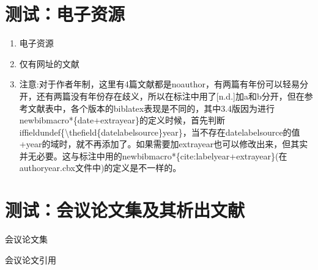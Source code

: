 \documentclass[twoside]{article}
\begin{document}
\section{测试：电子资源}
\begin{refsection}
\begin{enumerate}
  \item 电子资源\cite{Commonwealth--,HOPKINSON--,OMG2003--,OCLC--,李强2012-05-03--,萧钰2001--,Alliance--,Dublin2012-06-14--,JabRef中文手册--,1989--,JabRefManual--}

  \item 仅有网址的文献
\cite{1962-50-50,2009-155-155}
\cite{olnoauthorcn}
\cite{olnoauthoren}
\cite{Allianceurlonly}

\item 注意:对于作者年制，这里有4篇文献都是noauthor，有两篇有年份可以轻易分开，还有两篇没有年份存在歧义，所以在标注中用了[n.d.]加a和b分开，但在参考文献表中，各个版本的biblatex表现是不同的，其中3.4版因为进行newbibmacro*\{date+extrayear\}的定义时候，首先判断iffieldundef\{\textbackslash thefield\{datelabelsource\}year\}，当不存在datelabelsource的值+year的域时，就不再添加了。如果需要加extrayear也可以修改出来，但其实并无必要。这与标注中用的newbibmacro*\{cite:labelyear+extrayear\}(在authoryear.cbx文件中)的定义是不一样的。

\end{enumerate}

{
\printbibliography%
}
\end{refsection}

\section{测试：会议论文集及其析出文献}
\begin{refsection}
会议论文集\cite{陈志勇2011--,雷光春2012--,ROSENTHALL1963--,GANZHA2000--,Babu2014--,中国力学学会1999--, 中国社会科学院台湾史研究中心2012--}

会议论文引用\cite{韩吉人1985-90-99,FOURNEY1971-17-38,FOURNEY1971-17-38a,Nemec1997-209-214, 贾东琴2011-45-52, 裴丽生1981-2-10,汪学军2002-22-25,张忠智1997-33-34}
      \cite{Choi2002-1075-1080,Dardari2002-201-206,Firoozbakhsh2003-473-477,Foerster2002-1931-1935,
      Fontana2002-309-313,Giorgetti2005-794-798,Giorgetti2006--,Li2004-21-24,Nasri2008-3616-3621,Piazzo2001--}

{
\printbibliography%
}
\end{refsection}
\end{document}
